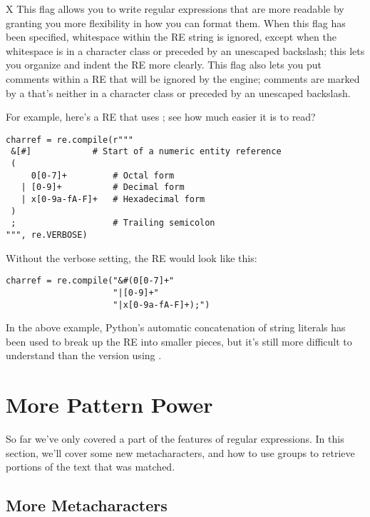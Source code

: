 \documentclass{howto}
\begin{document}
\begin{datadesc}{X}
 This flag allows you to write regular expressions
that are more readable by granting you more flexibility in how you can
format them.  When this flag has been specified, whitespace within the
RE string is ignored, except when the whitespace is in a character
class or preceded by an unescaped backslash; this lets you organize
and indent the RE more clearly.  This flag also lets you put comments
within a RE that will be ignored by the engine; comments are marked by
a \character{\#} that's neither in a character class or preceded by an
unescaped backslash.

For example, here's a RE that uses ; see how
much easier it is to read?

\begin{verbatim}
charref = re.compile(r"""
 &[#]		     # Start of a numeric entity reference
 (
     0[0-7]+         # Octal form
   | [0-9]+          # Decimal form
   | x[0-9a-fA-F]+   # Hexadecimal form
 )
 ;                   # Trailing semicolon
""", re.VERBOSE)
\end{verbatim}

Without the verbose setting, the RE would look like this:
\begin{verbatim}
charref = re.compile("&#(0[0-7]+"
                     "|[0-9]+"
                     "|x[0-9a-fA-F]+);")
\end{verbatim}

In the above example, Python's automatic concatenation of string
literals has been used to break up the RE into smaller pieces, but
it's still more difficult to understand than the version using
.

\end{datadesc}

\section{More Pattern Power}

So far we've only covered a part of the features of regular
expressions.  In this section, we'll cover some new metacharacters,
and how to use groups to retrieve portions of the text that was matched.

\subsection{More Metacharacters\label{more-metacharacters}}
\end{document}
